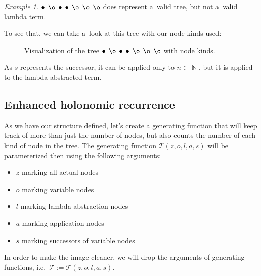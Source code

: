 \documentclass[final]{article}
\theoremstyle{definition}
\theoremstyle{definition}
\theoremstyle{remark}
\newtheorem{example}{Example}[subsection]
\newcommand{\gf}[1]{\ensuremath{\mathcal{#1}}}
\DeclareMathOperator{\N}{\mathbb{N}}
\DeclareMathOperator{\n}{\bullet}
\DeclareMathOperator{\no}{\o}
\begin{document}
\begin{example}
    \(\n\; \no\; \n\; \n\; \no\; \no\; \no\) does represent a~valid tree, but not a~valid lambda term.

To see that, we can take a~look at this tree with our node kinds used:

\begin{figure}[H]
    \centering
    
    \caption{Visualization of the tree \(\n\; \no\; \n\; \n\; \no\; \no\; \no\) with node kinds.}%
    \label{fig:lambda_tree_invalid}
\end{figure}

As \(s\) represents the successor, it can be applied only to \(n \in \N\), but it is applied to the lambda-abstracted term.
\end{example}

\subsection{Enhanced holonomic recurrence}%
\label{sub:enhanced_holonomic_reccurence}

As we have our structure defined, let's create a generating function that will keep track of more than just the number of nodes, but also counts the number of each kind of node in the tree. The generating function \(\gf{T}(z, o, l, a, s)\) will be parameterized then using the following arguments:
\begin{itemize}
    \item \(z\) marking all actual nodes
    \item \(o\) marking variable nodes
    \item \(l\) marking lambda abstraction nodes
    \item \(a\) marking application nodes
    \item \(s\) marking successors of variable nodes
\end{itemize}

In order to make the image cleaner, we will drop the arguments of generating functions, i.e.~\(\gf{T} := \gf{T}(z, o, l, a, s)\).
\end{document}
